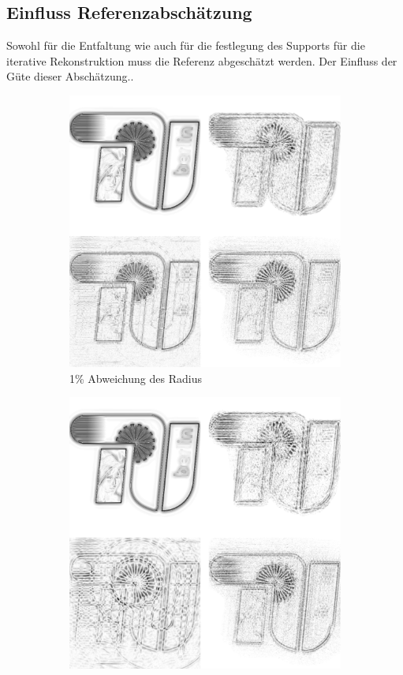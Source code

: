 \subsection{Einfluss Referenzabschätzung}
Sowohl für die Entfaltung wie auch für die festlegung des Supports für die iterative Rekonstruktion muss die Referenz abgeschätzt werden. Der Einfluss der Güte dieser Abschätzung..
\begin{figure}
	\begin{subfigure}[b]{0.45\textwidth}
		\includegraphics[width=\textwidth]{images/recon2d-mask16bit16error01.png}
		\caption{1\% Abweichung des Radius}
	\end{subfigure}
	\hspace*{\fill}
	\begin{subfigure}[b]{0.45\textwidth}
		\includegraphics[width=\textwidth]{images/recon2d-mask16bit16error05.png}

\end{subfigure}
\end{figure}
